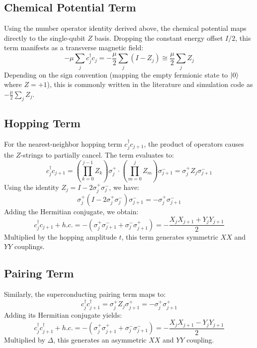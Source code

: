 \documentclass[11pt,a4paper]{article}
\begin{document}
\subsection{Chemical Potential Term}
Using the number operator identity derived above, the chemical potential maps directly to the single-qubit $Z$ basis. Dropping the constant energy offset $I/2$, this term manifests as a transverse magnetic field:
\begin{equation}
    -\mu \sum_{j} c_j^\dagger c_j = -\frac{\mu}{2} \sum_{j} (I - Z_j) \cong \frac{\mu}{2} \sum_{j} Z_j
\end{equation}
Depending on the sign convention (mapping the empty fermionic state to $\ket{0}$ where $Z=+1$), this is commonly written in the literature and simulation code as $-\frac{\mu}{2} \sum_j Z_j$.

\subsection{Hopping Term}
For the nearest-neighbor hopping term $c_j^\dagger c_{j+1}$, the product of operators causes the $Z$-strings to partially cancel. The term evaluates to:
\begin{equation}
    c_j^\dagger c_{j+1} = \left(\prod_{k=0}^{j-1}Z_k\right)\sigma_j^+ \cdot \left(\prod_{m=0}^{j}Z_m\right)\sigma_{j+1}^- = \sigma_j^+ Z_j \sigma_{j+1}^-
\end{equation}
Using the identity $Z_j = I - 2\sigma_j^+ \sigma_j^-$, we have:
\begin{equation}
    \sigma_j^+ (I - 2\sigma_j^+\sigma_j^-)\sigma_{j+1}^- = -\sigma_j^+\sigma_{j+1}^-
\end{equation}
Adding the Hermitian conjugate, we obtain:
\begin{equation}
    c_j^\dagger c_{j+1} + h.c. = -(\sigma_j^+\sigma_{j+1}^- + \sigma_j^-\sigma_{j+1}^+) = -\frac{X_j X_{j+1} + Y_j Y_{j+1}}{2}
\end{equation}
Multiplied by the hopping amplitude $t$, this term generates symmetric $XX$ and $YY$ couplings.

\subsection{Pairing Term}
Similarly, the superconducting pairing term maps to:
\begin{equation}
    c_j^\dagger c_{j+1}^\dagger = \sigma_j^+ Z_j \sigma_{j+1}^+ = -\sigma_j^+\sigma_{j+1}^+
\end{equation}
Adding its Hermitian conjugate yields:
\begin{equation}
    c_j^\dagger c_{j+1}^\dagger + h.c. = -(\sigma_j^+\sigma_{j+1}^+ + \sigma_j^-\sigma_{j+1}^-) = -\frac{X_j X_{j+1} - Y_j Y_{j+1}}{2}
\end{equation}
Multiplied by $\Delta$, this generates an asymmetric $XX$ and $YY$ coupling.
\end{document}
